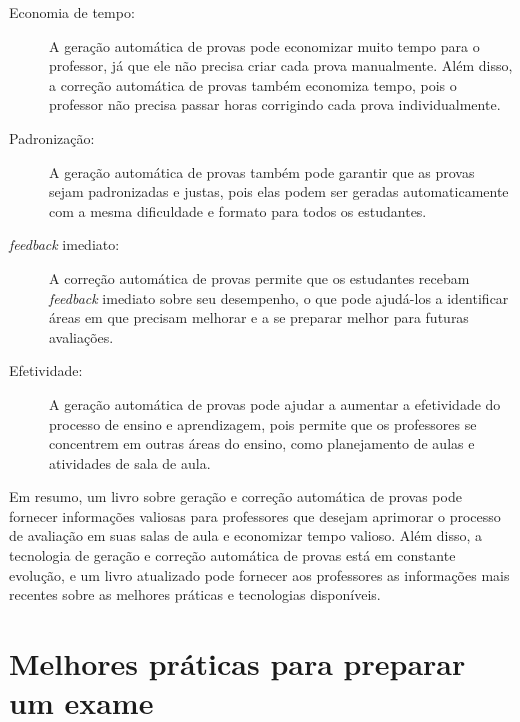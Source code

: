 \begin{description}
\item[Economia de tempo:] A geração automática de provas pode economizar muito tempo para o professor, já que ele não precisa criar cada prova manualmente. Além disso, a correção automática de provas também economiza tempo, pois o professor não precisa passar horas corrigindo cada prova individualmente.


\item[Padronização:] A geração automática de provas também pode garantir que as provas sejam padronizadas e justas, pois elas podem ser geradas automaticamente com a mesma dificuldade e formato para todos os estudantes.

\item[\textit{feedback} imediato:] A correção automática de provas permite que os estudantes recebam \textit{feedback} imediato sobre seu desempenho, o que pode ajudá-los a identificar áreas em que precisam melhorar e a se preparar melhor para futuras avaliações.

\item[Efetividade:] A geração automática de provas pode ajudar a aumentar a efetividade do processo de ensino e aprendizagem, pois permite que os professores se concentrem em outras áreas do ensino, como planejamento de aulas e atividades de sala de aula.
\end{description}

Em resumo, um livro sobre geração e correção automática de provas pode fornecer informações valiosas para professores que desejam aprimorar o processo de avaliação em suas salas de aula e economizar tempo valioso. Além disso, a tecnologia de geração e correção automática de provas está em constante evolução, e um livro atualizado pode fornecer aos professores as informações mais recentes sobre as melhores práticas e tecnologias disponíveis.

\section{Melhores práticas para preparar um exame}

